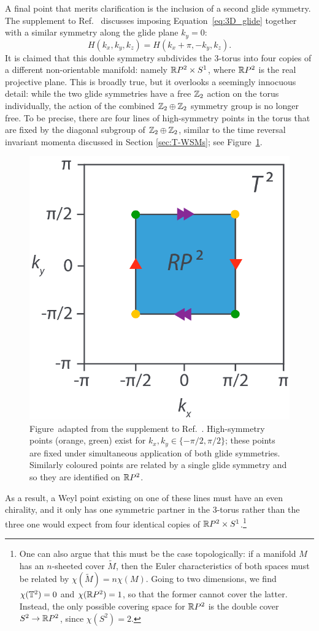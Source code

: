 A final point that merits clarification is the inclusion of a second glide symmetry. The supplement to Ref.~\cite{Fonseca-Vaidya_nonorientable} discusses imposing Equation~\eqref{eq:3D_glide} together with a similar symmetry along the glide plane $k_y = 0$:
\begin{equation}
	H(k_x, k_y, k_z) = H(k_x + \pi, -k_y, k_z).
\end{equation}
It is claimed that this double symmetry subdivides the 3-torus into four copies of a different non-orientable manifold: namely $\mathbb{R} P^2\times S^1$, where $\mathbb{R} P^2$ is the real projective plane. This is broadly true, but it overlooks a seemingly innocuous detail: while the two glide symmetries have a free $\mathbb{Z}_2$ action on the torus individually, the action of the combined $\mathbb{Z}_2\oplus\mathbb{Z}_2$ symmetry group is no longer free. To be precise, there are four lines of high-symmetry points in the torus that are fixed by the diagonal subgroup of $\mathbb{Z}_2\oplus\mathbb{Z}_2$, similar to the time reversal invariant momenta discussed in Section \ref{sec:T-WSMs}; see Figure~\ref{fig:RP2-corners}.
\begin{figure}[htb!]
	\centering
	\includegraphics[width=.5\linewidth]{Images/RP2-corners}
	\caption{Figure~adapted from the supplement to Ref.~\cite{Fonseca-Vaidya_nonorientable}. High-symmetry points (orange, green) exist for $k_x,k_y\in\{-\pi/2,\pi/2\}$; these points are fixed under simultaneous application of both glide symmetries. Similarly coloured points are related by a single glide symmetry and so they are identified on $\mathbb{R} P^2$.}
	\label{fig:RP2-corners}
\end{figure}
As a result, a Weyl point existing on one of these lines must have an even chirality, and it only has one symmetric partner in the 3-torus rather than the three one would expect from four identical copies of $\mathbb{R} P^2\times S^1$.\footnote{
	One can also argue that this must be the case topologically: if a manifold $M$ has an $n$-sheeted cover $\tilde{M}$, then the Euler characteristics of both spaces must be related by $\chi(\tilde{M}) = n\chi(M)$. Going to two dimensions, we find $\chi(\mathbb{T}^2) = 0$ and $\chi(\mathbb{R} P^2) = 1$, so that the former cannot cover the latter. Instead, the only possible covering space for $\mathbb{R} P^2$ is the double cover $S^2\to\mathbb{R} P^2$, since $\chi(S^2) = 2$.}
